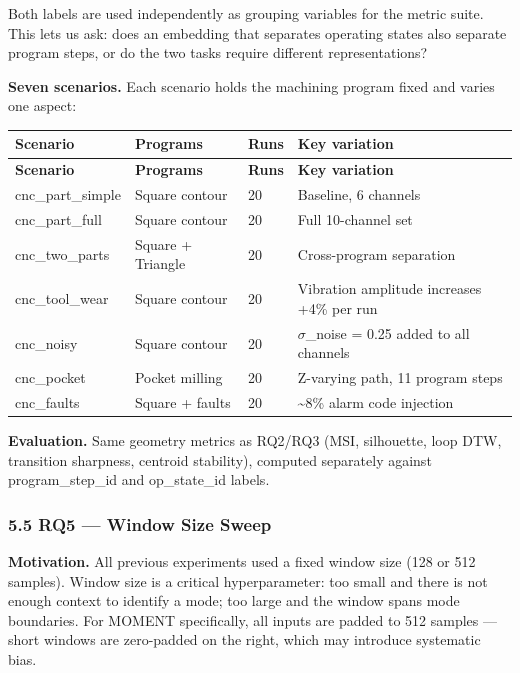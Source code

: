 \documentclass[11pt,a4paper]{article}
\begin{document}
Both labels are used independently as grouping variables for the metric suite. This lets us ask:
does an embedding that separates operating states also separate program steps, or do the two tasks
require different representations?

\textbf{Seven scenarios.} Each scenario holds the machining program fixed and varies one aspect:

\begin{longtable}{|l|l|l|l|}
\hline
\textbf{Scenario} & \textbf{Programs} & \textbf{Runs} & \textbf{Key variation} \\
\hline
\endfirsthead
\hline
\textbf{Scenario} & \textbf{Programs} & \textbf{Runs} & \textbf{Key variation} \\
\hline
\endhead
\hline
\endfoot
cnc\_part\_simple & Square contour & 20 & Baseline, 6 channels \\
\hline
cnc\_part\_full & Square contour & 20 & Full 10-channel set \\
\hline
cnc\_two\_parts & Square + Triangle & 20 & Cross-program separation \\
\hline
cnc\_tool\_wear & Square contour & 20 & Vibration amplitude increases +4\% per run \\
\hline
cnc\_noisy & Square contour & 20 & $\sigma$\_noise = 0.25 added to all channels \\
\hline
cnc\_pocket & Pocket milling & 20 & Z-varying path, 11 program steps \\
\hline
cnc\_faults & Square + faults & 20 & \textasciitilde{}8\% alarm code injection \\
\hline
\end{longtable}

\textbf{Evaluation.} Same geometry metrics as RQ2/RQ3 (MSI, silhouette, loop DTW, transition sharpness,
centroid stability), computed separately against program\_step\_id and op\_state\_id labels.

\subsubsection{5.5 RQ5 --- Window Size Sweep}

\textbf{Motivation.} All previous experiments used a fixed window size (128 or 512 samples). Window
size is a critical hyperparameter: too small and there is not enough context to identify a mode;
too large and the window spans mode boundaries. For MOMENT specifically, all inputs are padded
to 512 samples --- short windows are zero-padded on the right, which may introduce systematic bias.
\end{document}
